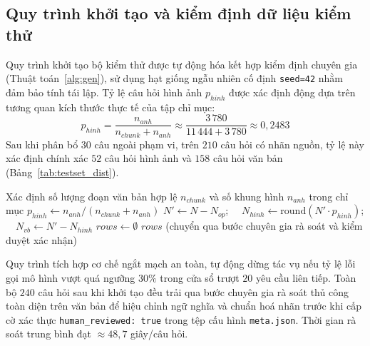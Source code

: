 \subsection{Quy trình khởi tạo và kiểm định dữ liệu kiểm thử}
Quy trình khởi tạo bộ kiểm thử được tự động hóa kết hợp kiểm định chuyên gia (Thuật toán~\ref{alg:gen}), sử dụng hạt giống ngẫu nhiên cố định \texttt{seed=42} nhằm đảm bảo tính tái lập. Tỷ lệ câu hỏi hình ảnh $p_{hinh}$ được xác định động dựa trên tương quan kích thước thực tế của tập chỉ mục:
\begin{equation}
p_{hinh} = \frac{n_{anh}}{n_{chunk} + n_{anh}} \approx \frac{3\,780}{11\,444 + 3\,780} \approx 0{,}2483
\end{equation}
Sau khi phân bổ $30$ câu ngoài phạm vi, trên $210$ câu hỏi có nhãn nguồn, tỷ lệ này xác định chính xác $52$ câu hỏi hình ảnh và $158$ câu hỏi văn bản (Bảng~\ref{tab:testset_dist}).

\begin{algorithm2e}[H]
\caption{Quy trình khởi tạo bộ dữ liệu kiểm thử ngẫu nhiên phân tầng}
\label{alg:gen}
\SetAlgoLined
{}
Xác định số lượng đoạn văn bản hợp lệ $n_{chunk}$ và số khung hình $n_{anh}$ trong chỉ mục\;
$p_{hinh} \leftarrow n_{anh} / (n_{chunk} + n_{anh})$\;
$N' \leftarrow N - N_{op}$; $\quad N_{hinh} \leftarrow \mathrm{round}(N' \cdot p_{hinh})$; $\quad N_{vb} \leftarrow N' - N_{hinh}$\;
$rows \leftarrow \emptyset$\;
\Return $rows$ (chuyển qua bước chuyên gia rà soát và kiểm duyệt xác nhận)\;
\end{algorithm2e}

Quy trình tích hợp cơ chế ngắt mạch an toàn, tự động dừng tác vụ nếu tỷ lệ lỗi gọi mô hình vượt quá ngưỡng $30\%$ trong cửa sổ trượt $20$ yêu cầu liên tiếp. Toàn bộ $240$ câu hỏi sau khi khởi tạo đều trải qua bước chuyên gia rà soát thủ công toàn diện trên văn bản để hiệu chỉnh ngữ nghĩa và chuẩn hoá nhãn trước khi cấp cờ xác thực \texttt{human\_reviewed: true} trong tệp cấu hình \texttt{meta.json}. Thời gian rà soát trung bình đạt $\approx 48{,}7$ giây/câu hỏi.

